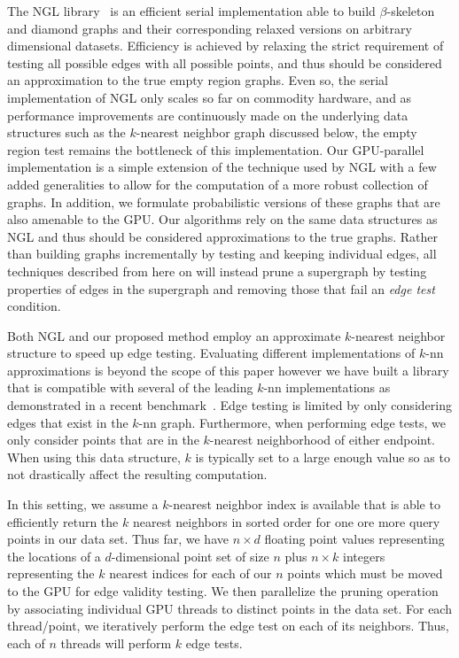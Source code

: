 The NGL library~\cite{CorreaLindstrom2011} is an efficient serial implementation able to build $\beta$-skeleton and diamond graphs and their corresponding relaxed versions on arbitrary dimensional datasets.
%
Efficiency is achieved by relaxing the strict requirement of testing all possible edges with all possible points, and thus should be considered an approximation to the true empty region graphs.
%
Even so, the serial implementation of NGL only scales so far on commodity hardware, and as performance improvements are continuously made on the underlying data structures such as the $k$-nearest neighbor graph discussed below, the empty region test remains the bottleneck of this implementation.
%
Our GPU-parallel implementation is a simple extension of the technique used by NGL with a few added generalities to allow for the computation of a more robust collection of graphs.
%
In addition, we formulate probabilistic versions of these graphs that are also amenable to the GPU.
%
Our algorithms rely on the same data structures as NGL and thus should be considered approximations to the true graphs.
%
Rather than building graphs incrementally by testing and keeping individual edges, all techniques described from here on will instead prune a supergraph by testing properties of edges in the supergraph and removing those that fail an \emph{edge test} condition.

Both NGL and our proposed method employ an approximate $k$-nearest neighbor structure to speed up edge testing.
%
Evaluating different implementations of $k$-nn approximations is beyond the scope of this paper however we have built a library that is compatible with several of the leading $k$-nn implementations as demonstrated in a recent benchmark~\cite{AumullerBernhardssonFaithfull2017}.
%
Edge testing is limited by only considering edges that exist in the $k$-nn graph.
%
Furthermore, when performing edge tests, we only consider points that are in the $k$-nearest neighborhood of either endpoint.
%
When using this data structure, $k$ is typically set to a large enough value so as to not drastically affect the resulting computation.
%

In this setting, we assume a $k$-nearest neighbor index is available that is able to efficiently return the $k$ nearest neighbors in sorted order for one ore more query points in our data set.
%
Thus far, we have $n \times d$ floating point values representing the locations of a $d$-dimensional point set of size $n$ plus $n \times k$ integers representing the $k$ nearest indices for each of our $n$ points which must be moved to the GPU for edge validity testing.
%
We then parallelize the pruning operation by associating individual GPU threads to distinct points in the data set.
%
For each thread/point, we iteratively perform the edge test on each of its neighbors.
%
Thus, each of $n$ threads will perform $k$ edge tests.

